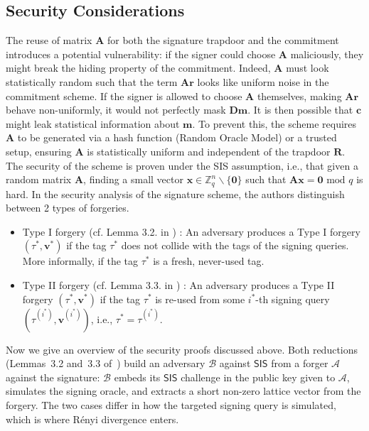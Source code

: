 \documentclass[a4paper]{article}
\begin{document}
\subsection{Security Considerations}
\label{securityconsiderations}
The reuse of matrix $\mathbf{A}$ for both the signature trapdoor and the commitment introduces a potential vulnerability:
if the signer could choose $\mathbf{A}$ maliciously, they might break the hiding property of the commitment. Indeed, $\mathbf{A}$ must look statistically 
random such that the term $\mathbf{Ar}$ looks like uniform noise in the commitment scheme. If the signer is allowed to choose $\mathbf{A}$ themselves, making $\mathbf{Ar}$ behave 
non-uniformly, it would not perfectly mask $\mathbf{Dm}$. It is then possible that $\mathbf{c}$ might leak statistical information about $\mathbf{m}$. To prevent
this, the scheme requires $\mathbf{A}$ to be generated via a hash function (Random Oracle Model) or a trusted setup,
ensuring $\mathbf{A}$ is statistically uniform and independent of the trapdoor $\mathbf{R}$. The security of the scheme
is proven under the SIS assumption, i.e., that given a random matrix $\mathbf{A}$, finding a small vector $\mathbf{x} \in \mathbb{Z}_q^n \backslash \{\mathbf{0}\}$ such that $\mathbf{Ax} = \mathbf{0} \text{ mod }q$ is hard.
In the security analysis of the signature scheme, the authors distinguish between 2 types of forgeries. 
\begin{itemize}
    \item Type I forgery (cf. Lemma 3.2. in \cite{mainPaper}) : An adversary produces a Type I forgery $(\tau^*, \mathbf{v}^*)$ if the tag $\tau^*$ does not collide 
          with the tags of the signing queries. More informally, if the tag $\tau^*$ is a fresh, never-used tag. 
    \item Type II forgery (cf. Lemma 3.3. in \cite{mainPaper}) : An adversary produces a Type II forgery $(\tau^*, \mathbf{v}^*)$ if the tag $\tau^*$ is re-used 
          from some $i^*$-th signing query $(\tau^{(i^*)}, \mathbf{v}^{(i^*)})$, i.e., $\tau^* = \tau^{(i^*)}$. 
\end{itemize} 
Now we give an overview of the security proofs discussed above. Both reductions (Lemmas~3.2 and~3.3 of~\cite{mainPaper}) build
an adversary $\mathcal{B}$ against $\mathsf{SIS}$ from a forger
$\mathcal{A}$ against the signature: $\mathcal{B}$ embeds its $\mathsf{SIS}$
challenge in the public key given to $\mathcal{A}$, simulates the signing
oracle, and extracts a short non-zero lattice vector from the forgery. The
two cases differ in how the targeted signing query is simulated, which is
where R\'enyi divergence enters.
\end{document}
